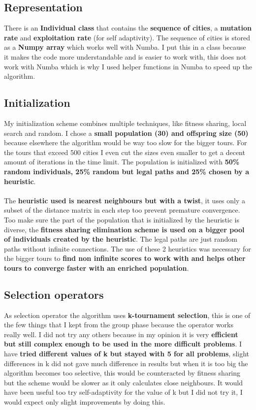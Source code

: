 \documentclass[a4paper,10pt]{article}
\begin{document}
\clearpage

\subsection{Representation}
There is an \textbf{Individual class} that contains the \textbf{sequence of cities}, a \textbf{mutation rate} and \textbf{exploitation rate} (for self adaptivity). The sequence of cities is stored as a \textbf{Numpy array} which works well with Numba. I put this in a class because it makes the code more understandable and is easier to work with, this does not work with Numba which is why I used helper functions in Numba to speed up the algorithm.

\subsection{Initialization}
\label{init}
My initialization scheme combines multiple techniques, like fitness sharing, local search and random. I chose a \textbf{small population (30) and offspring size (50)} because elsewhere the algorithm would be way too slow for the bigger tours. For the tours that exceed 500 cities I even cut the sizes even smaller to get a decent amount of iterations in the time limit. The population is initialized with \textbf{50\% random individuals, 25\% random but legal paths and 25\% chosen by a heuristic}. 
\\\\
The \textbf{heuristic used is nearest neighbours but with a twist}, it uses only a subset of the distance matrix in each step too prevent premature convergence. Too make sure the part of the population that is initialized by the heuristic is diverse, the \textbf{fitness sharing elimination scheme is used on a bigger pool of individuals created by the heuristic}. The legal paths are just random paths without infinite connections. The use of these 2 heuristics was necessary for the bigger tours to \textbf{find non infinite scores to work with and helps other tours to converge faster with an enriched population}.

\subsection{Selection operators}
As selection operator the algorithm uses \textbf{k-tournament selection}, this is one of the few things that I kept from the group phase because the operator works really well. I did not try any others because in my opinion it is very \textbf{efficient but still complex enough to be used in the more difficult problems}. I have \textbf{tried different values of k but stayed with 5 for all problems}, slight differences in k did not gave much difference in results but when it is too big the algorithm becomes too selective, this would be counteracted by fitness sharing but the scheme would be slower as it only calculates close neighbours. It would have been useful too try self-adaptivity for the value of k but I did not try it, I would expect only slight improvements by doing this.
\end{document}
